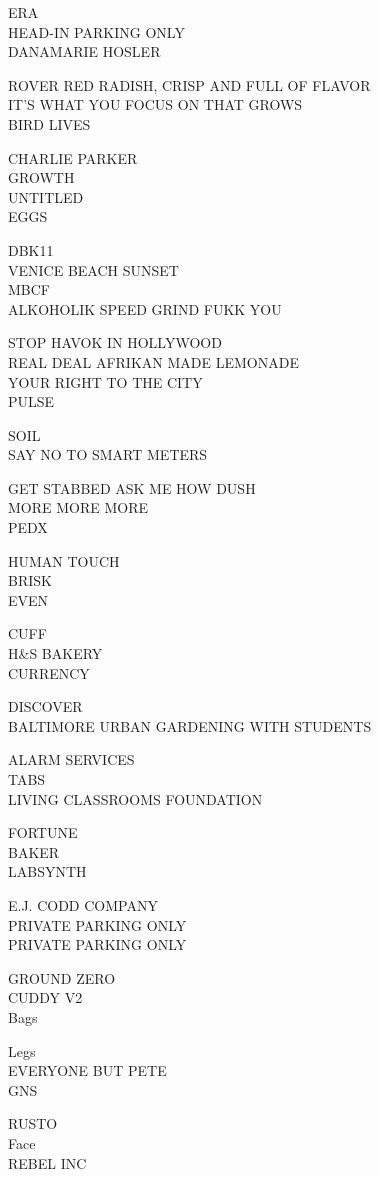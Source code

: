 \documentclass[10pt,letterpaper]{article}
\begin{document}
ERA\\
HEAD{-}IN PARKING ONLY\\
DANAMARIE HOSLER

ROVER RED RADISH, CRISP AND FULL OF FLAVOR\\
IT'S WHAT YOU FOCUS ON THAT GROWS\\
BIRD LIVES

CHARLIE PARKER\\
GROWTH\\
UNTITLED\\
EGGS

DBK11\\
VENICE BEACH SUNSET\\
MBCF\\
ALKOHOLIK SPEED GRIND FUKK YOU

STOP HAVOK IN HOLLYWOOD\\
REAL DEAL AFRIKAN MADE LEMONADE\\
YOUR RIGHT TO THE CITY\\
PULSE

SOIL\\
SAY NO TO SMART METERS

GET STABBED ASK ME HOW DUSH\\
MORE MORE MORE\\
PEDX

HUMAN TOUCH\\
BRISK\\
EVEN

CUFF\\
H\&S BAKERY\\
CURRENCY

DISCOVER\\
BALTIMORE URBAN GARDENING WITH STUDENTS

ALARM SERVICES\\
TABS\\
LIVING CLASSROOMS FOUNDATION

FORTUNE\\
BAKER\\
LABSYNTH

E.J. CODD COMPANY\\
PRIVATE PARKING ONLY\\
PRIVATE PARKING ONLY

GROUND ZERO\\
CUDDY V2\\
Bags

Legs\\
EVERYONE BUT PETE\\
GNS

RUSTO\\
Face\\
REBEL INC
\end{document}
